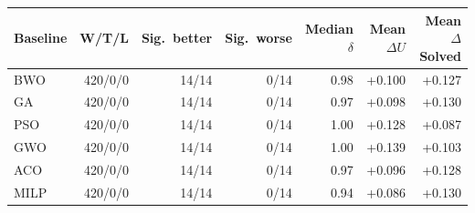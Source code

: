 \begin{tabular}{lrrrrrr}\toprule
Baseline & W/T/L & Sig.\ better & Sig.\ worse & Median $\delta$ & Mean $\Delta U$ & Mean $\Delta$Solved\\\midrule
BWO & 420/0/0 & 14/14 & 0/14 & 0.98 & +0.100 & +0.127\\
GA & 420/0/0 & 14/14 & 0/14 & 0.97 & +0.098 & +0.130\\
PSO & 420/0/0 & 14/14 & 0/14 & 1.00 & +0.128 & +0.087\\
GWO & 420/0/0 & 14/14 & 0/14 & 1.00 & +0.139 & +0.103\\
ACO & 420/0/0 & 14/14 & 0/14 & 0.97 & +0.096 & +0.128\\
MILP & 420/0/0 & 14/14 & 0/14 & 0.94 & +0.086 & +0.130\\
\bottomrule
\end{tabular}
